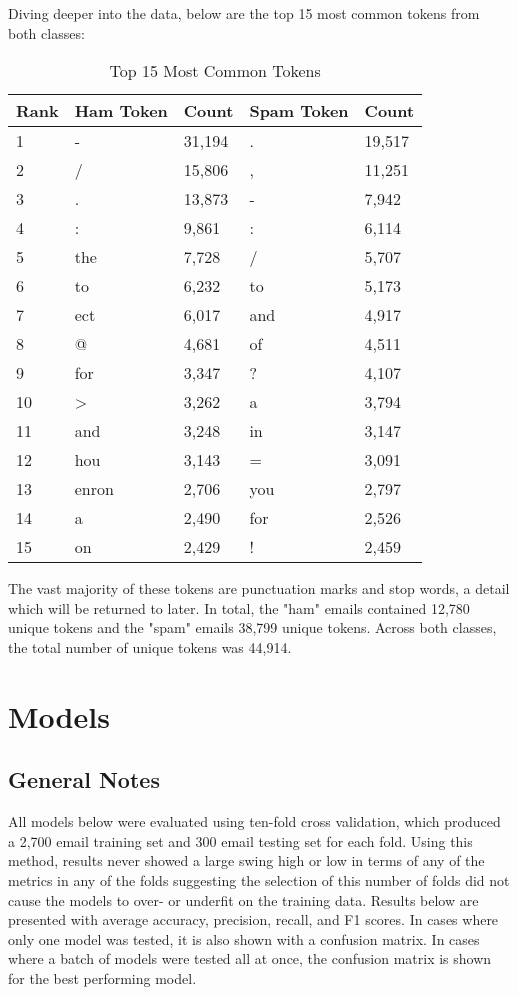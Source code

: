 \documentclass[a4paper]{article}
\begin{document}
	Diving deeper into the data, below are the top 15 most common tokens from both classes:
	
	\begin{table}[H]
		\centering
		\caption{Top 15 Most Common Tokens}
		\begin{tabular}{l|ll|ll}
			Rank & Ham Token & Count  & Spam Token & Count \\
			\hline
			1    & -		 & 31,194 & .		   & 19,517 \\
			2 	 & /		 & 15,806 & ,		   & 11,251 \\
			3	 & .		 & 13,873 & -		   & 7,942 \\
			4	 & :		 & 9,861  & :		   & 6,114 \\
			5    & the		 & 7,728  & /		   & 5,707 \\
			6    & to        & 6,232  & to         & 5,173 \\
			7    & ect       & 6,017  & and		   & 4,917 \\
			8    & @		 & 4,681  & of		   & 4,511 \\
			9	 & for	  	 & 3,347  & ?		   & 4,107 \\
			10   & >		 & 3,262  & a		   & 3,794 \\
			11   & and		 & 3,248  & in		   & 3,147 \\
			12   & hou		 & 3,143  & =		   & 3,091 \\
			13	 & enron	 & 2,706  & you		   & 2,797 \\
			14	 & a		 & 2,490  & for		   & 2,526 \\
			15	 & on		 & 2,429  & !		   & 2,459
		\end{tabular}
	\end{table}

	The vast majority of these tokens are punctuation marks and stop words, a detail which will be returned to later. In total, the "ham" emails contained 12,780 unique tokens and the "spam" emails 38,799 unique tokens. Across both classes, the total number of unique tokens was 44,914.
	
	\section{Models}
	
	\subsection{General Notes}
	
	All models below were evaluated using ten-fold cross validation, which produced a 2,700 email training set and 300 email testing set for each fold. Using this method, results never showed a large swing high or low in terms of any of the metrics in any of the folds suggesting the selection of this number of folds did not cause the models to over- or underfit on the training data. Results below are presented with average accuracy, precision, recall, and F1 scores. In cases where only one model was tested, it is also shown with a confusion matrix. In cases where a batch of models were tested all at once, the confusion matrix is shown for the best performing model.
	
\end{document}
